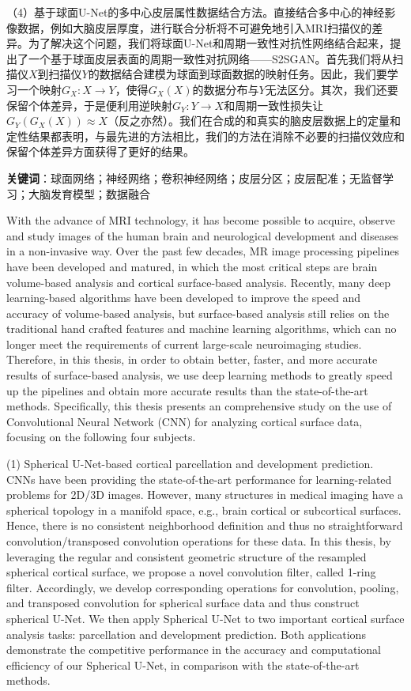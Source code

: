（4）基于球面U-Net的多中心皮层属性数据结合方法。直接结合多中心的神经影像数据，例如大脑皮层厚度，进行联合分析将不可避免地引入MRI扫描仪的差异。为了解决这个问题，我们将球面U-Net和周期一致性对抗性网络结合起来，提出了一个基于球面皮层表面的周期一致性对抗网络——S2SGAN。首先我们将从扫描仪$X$到扫描仪$Y$的数据结合建模为球面到球面数据的映射任务。因此，我们要学习一个映射$G_X:X\rightarrow Y$，使得$G_X(X)$的数据分布与$Y$无法区分。其次，我们还要保留个体差异，于是便利用逆映射$G_Y:Y\rightarrow X$和周期一致性损失让$G_Y(G_X(X))\approx X$（反之亦然）。我们在合成的和真实的脑皮层数据上的定量和定性结果都表明，与最先进的方法相比，我们的方法在消除不必要的扫描仪效应和保留个体差异方面获得了更好的结果。



\textbf{关键词}：球面网络；神经网络；卷积神经网络；皮层分区；皮层配准；无监督学习；大脑发育模型；数据融合






\cleardoublepage
{}
With the advance of MRI technology, it has become possible to acquire, observe and study images of the human brain and neurological development and diseases in a non-invasive way. Over the past few decades, MR image processing pipelines have been developed and matured, in which the most critical steps are brain volume-based analysis and cortical surface-based analysis. Recently, many deep learning-based algorithms have been developed to improve the speed and accuracy of volume-based analysis, but surface-based analysis still relies on the traditional hand crafted features and machine learning algorithms, which can no longer meet the requirements of current large-scale neuroimaging studies. Therefore, in this thesis, in order to obtain better, faster, and more accurate results of surface-based analysis, we use deep learning methods to greatly speed up the pipelines and obtain more accurate results than the state-of-the-art methods. Specifically, this thesis presents an comprehensive study on the use of Convolutional Neural Network (CNN) for analyzing cortical surface data, focusing on the following four subjects.

(1) Spherical U-Net-based cortical parcellation and development prediction. CNNs have been providing the state-of-the-art performance for learning-related problems for 2D/3D images. However, many structures in medical imaging have a spherical topology in a manifold space, e.g., brain cortical or subcortical surfaces. Hence, there is no consistent neighborhood definition and thus no straightforward convolution/transposed convolution operations for these data. In this thesis, by leveraging the regular and consistent geometric structure of the resampled spherical cortical surface, we propose a novel convolution filter, called 1-ring filter. Accordingly, we develop corresponding operations for convolution, pooling, and transposed convolution for spherical surface data and thus construct spherical U-Net. We then apply Spherical U-Net to two important cortical surface analysis tasks: parcellation and development prediction. Both applications demonstrate the competitive performance in the accuracy and computational efficiency of our Spherical U-Net, in comparison with the state-of-the-art methods.
 

